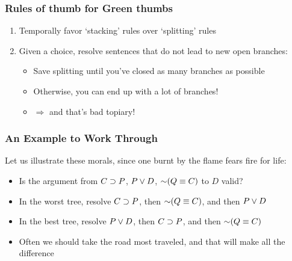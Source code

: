 \begin{frame}
\frametitle{Rules of thumb for Green thumbs}

\begin{enumerate}[<+->]

\item Temporally favor `stacking' rules over `splitting' rules

\item Given a choice, resolve sentences that do not lead to new open branches:

\medskip

\begin{itemize}

\item Save splitting until you've closed as many branches as possible  

\item Otherwise, you can end up with a lot of branches! 

\item[] $\Rightarrow$ and that's bad topiary! 

\end{itemize}

\end{enumerate}
\end{frame}



\begin{frame}
\frametitle{An Example to Work Through}

Let us illustrate these morals, since one burnt by the flame fears fire for life:

\begin{itemize}[<+->]

\item Is the argument from $C \supset P$, $P \vee D$, $\enot (Q \eiff C)$ to $D$ valid? 

\item In the worst tree, resolve $C \supset P$, then $\enot (Q \eiff C)$, and then $P \vee D$

\item In the best tree, resolve $P \vee D$, then $C \supset P$, and then $\enot (Q \eiff C)$

\item Often we should take the road most traveled, and that will make all the difference

\end{itemize}
\end{frame}

